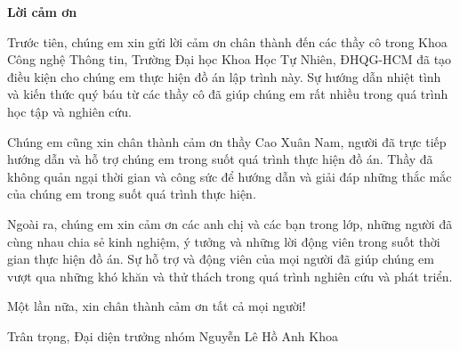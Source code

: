 \newpage
\vfill
\begin{center}
	\textbf{\Large Lời cảm ơn}
\end{center}
\indent\hspace{0.6cm} Trước tiên, chúng em xin gửi lời cảm ơn chân thành đến các thầy cô trong Khoa Công nghệ Thông tin, Trường Đại học Khoa Học Tự Nhiên, ĐHQG-HCM đã tạo điều kiện cho chúng em thực hiện đồ án lập trình này. Sự hướng dẫn nhiệt tình và kiến thức quý báu từ các thầy cô đã giúp chúng em rất nhiều trong quá trình học tập và nghiên cứu. \newline

Chúng em cũng xin chân thành cảm ơn thầy Cao Xuân Nam, người đã trực tiếp hướng dẫn và hỗ trợ chúng em trong suốt quá trình thực hiện đồ án. Thầy đã không quản ngại thời gian và công sức để hướng dẫn và giải đáp những thắc mắc của chúng em trong suốt quá trình thực hiện.\newline

Ngoài ra, chúng em xin cảm ơn các anh chị và các bạn trong lớp, những người đã cùng nhau chia sẻ kinh nghiệm, ý tưởng và những lời động viên trong suốt thời gian thực hiện đồ án. Sự hỗ trợ và động viên của mọi người đã giúp chúng em vượt qua những khó khăn và thử thách trong quá trình nghiên cứu và phát triển.\newline

Một lần nữa, xin chân thành cảm ơn tất cả mọi người!\newline

\indent Trân trọng,\newline
\indent Đại diện trưởng nhóm\newline
\indent Nguyễn Lê Hồ Anh Khoa
\vfill

\newpage